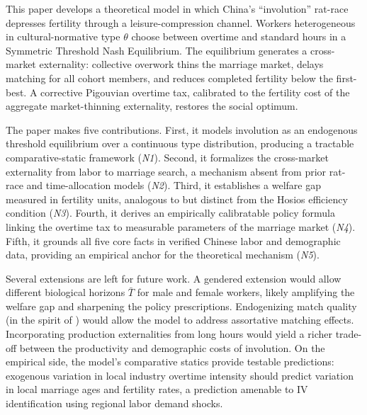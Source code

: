 \documentclass[12pt]{article}
\theoremstyle{plain}
\theoremstyle{definition}
\theoremstyle{remark}
\begin{document}
This paper develops a theoretical model in which China's ``involution'' rat-race
depresses fertility through a leisure-compression channel.  Workers heterogeneous in
cultural-normative type $\theta$ choose between overtime and standard hours in a
Symmetric Threshold Nash Equilibrium.  The equilibrium generates a cross-market
externality: collective overwork thins the marriage market, delays matching for all
cohort members, and reduces completed fertility below the first-best.  A corrective
Pigouvian overtime tax, calibrated to the fertility cost of the aggregate
market-thinning externality, restores the social optimum.

The paper makes five contributions.  First, it models involution as an endogenous
threshold equilibrium over a continuous type distribution, producing a tractable
comparative-static framework (\emph{N1}).  Second, it formalizes the cross-market
externality from labor to marriage search, a mechanism absent from prior rat-race
and time-allocation models (\emph{N2}).  Third, it establishes a welfare gap measured
in fertility units, analogous to but distinct from the Hosios efficiency condition
(\emph{N3}).  Fourth, it derives an empirically calibratable policy formula linking
the overtime tax to measurable parameters of the marriage market (\emph{N4}).
Fifth, it grounds all five core facts in verified Chinese labor and demographic
data, providing an empirical anchor for the theoretical mechanism (\emph{N5}).

Several extensions are left for future work.  A gendered extension would allow
different biological horizons $\bar{T}$ for male and female workers, likely
amplifying the welfare gap and sharpening the policy prescriptions.  Endogenizing
match quality (in the spirit of \citealt{ShimerSmith2000}) would allow the model
to address assortative matching effects.  Incorporating production externalities from
long hours would yield a richer trade-off between the productivity and demographic
costs of involution.  On the empirical side, the model's comparative statics
provide testable predictions: exogenous variation in local industry overtime intensity
should predict variation in local marriage ages and fertility rates, a prediction
amenable to IV identification using regional labor demand shocks.
\end{document}
